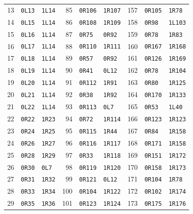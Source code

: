 \begin{longtable}{@{}rll@{\hspace{1.4em}}rll@{\hspace{1.4em}}rll@{}}
13 & \texttt{0L13} & \texttt{1L14} & 85 & \texttt{0R106} & \texttt{1R107} & 157 & \texttt{0R105} & \texttt{1R78} \\
14 & \texttt{0L15} & \texttt{1L14} & 86 & \texttt{0R108} & \texttt{1R109} & 158 & \texttt{0R98} & \texttt{1L103} \\
15 & \texttt{0L16} & \texttt{1L14} & 87 & \texttt{0R75} & \texttt{0R92} & 159 & \texttt{0R78} & \texttt{1R83} \\
16 & \texttt{0L17} & \texttt{1L14} & 88 & \texttt{0R110} & \texttt{1R111} & 160 & \texttt{0R167} & \texttt{1R168} \\
17 & \texttt{0L18} & \texttt{1L14} & 89 & \texttt{0R57} & \texttt{0R92} & 161 & \texttt{0R126} & \texttt{1R169} \\
18 & \texttt{0L19} & \texttt{1L14} & 90 & \texttt{0R41} & \texttt{0L12} & 162 & \texttt{0R78} & \texttt{1R104} \\
19 & \texttt{0L20} & \texttt{1L14} & 91 & \texttt{0R112} & \texttt{1R91} & 163 & \texttt{0R80} & \texttt{1R125} \\
20 & \texttt{0L21} & \texttt{1L14} & 92 & \texttt{0R38} & \texttt{1R92} & 164 & \texttt{0R170} & \texttt{1R133} \\
21 & \texttt{0L22} & \texttt{1L14} & 93 & \texttt{0R113} & \texttt{0L7} & 165 & \texttt{0R53} & \texttt{1L40} \\
22 & \texttt{0R22} & \texttt{1R23} & 94 & \texttt{0R72} & \texttt{1R114} & 166 & \texttt{0R123} & \texttt{1R123} \\
23 & \texttt{0R24} & \texttt{1R25} & 95 & \texttt{0R115} & \texttt{1R44} & 167 & \texttt{0R84} & \texttt{1R158} \\
24 & \texttt{0R26} & \texttt{1R27} & 96 & \texttt{0R116} & \texttt{1R117} & 168 & \texttt{0R171} & \texttt{1R158} \\
25 & \texttt{0R28} & \texttt{1R29} & 97 & \texttt{0R33} & \texttt{1R118} & 169 & \texttt{0R151} & \texttt{1R172} \\
26 & \texttt{0R30} & \texttt{0L7} & 98 & \texttt{0R119} & \texttt{1R120} & 170 & \texttt{0R158} & \texttt{1R173} \\
27 & \texttt{0R31} & \texttt{1R32} & 99 & \texttt{0R121} & \texttt{0L12} & 171 & \texttt{0R104} & \texttt{1R78} \\
28 & \texttt{0R33} & \texttt{1R34} & 100 & \texttt{0R104} & \texttt{1R122} & 172 & \texttt{0R102} & \texttt{1R174} \\
29 & \texttt{0R35} & \texttt{1R36} & 101 & \texttt{0R123} & \texttt{1R124} & 173 & \texttt{0R175} & \texttt{1R176} \\

\end{longtable}
